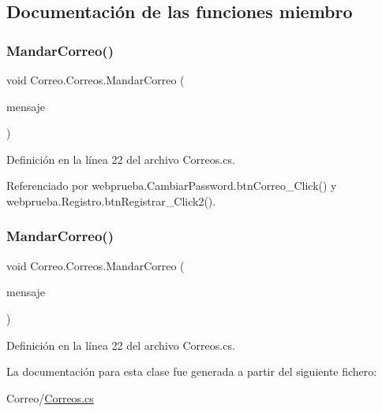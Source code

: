\subsection{Documentación de las funciones miembro}
\mbox{\label{class_correo_1_1_correos_af1d6303f7e2fa380b3476a766dd8474c}} 
\subsubsection{\texorpdfstring{MandarCorreo()}{MandarCorreo()}\hspace{0.1cm}{\footnotesize\ttfamily [1/2]}}
{\footnotesize\ttfamily void Correo.\+Correos.\+Mandar\+Correo (\begin{DoxyParamCaption}\item[{Mail\+Message}]{mensaje }\end{DoxyParamCaption})}



Definición en la línea 22 del archivo Correos.\+cs.


\begin{DoxyCode}{0}

\end{DoxyCode}


Referenciado por webprueba.\+Cambiar\+Password.\+btn\+Correo\+\_\+\+Click() y webprueba.\+Registro.\+btn\+Registrar\+\_\+\+Click2().

\mbox{\label{class_correo_1_1_correos_af1d6303f7e2fa380b3476a766dd8474c}} 
\subsubsection{\texorpdfstring{MandarCorreo()}{MandarCorreo()}\hspace{0.1cm}{\footnotesize\ttfamily [2/2]}}
{\footnotesize\ttfamily void Correo.\+Correos.\+Mandar\+Correo (\begin{DoxyParamCaption}\item[{Mail\+Message}]{mensaje }\end{DoxyParamCaption})}



Definición en la línea 22 del archivo Correos.\+cs.


\begin{DoxyCode}{0}

\end{DoxyCode}


La documentación para esta clase fue generada a partir del siguiente fichero\+:\begin{DoxyCompactItemize}
\item 
Correo/\mbox{\hyperlink{_correo_2_correos_8cs}{Correos.\+cs}}\end{DoxyCompactItemize}
